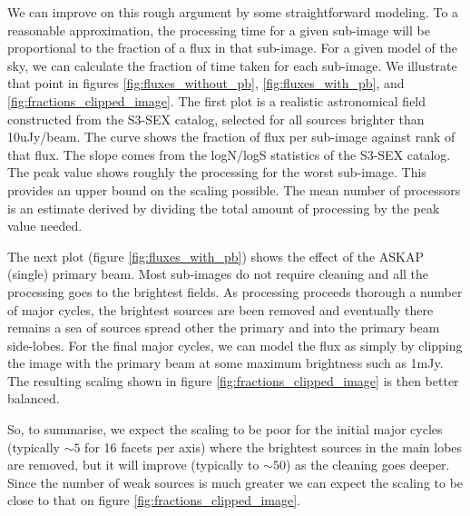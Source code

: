 \documentclass[11pt,a4paper,variablewidth]{article}
\begin{document}
We can improve on this rough argument by some straightforward modeling. To a reasonable approximation, the processing time for a given sub-image will be proportional to the fraction of a flux in that sub-image. For a given model of the sky, we can calculate the fraction of time taken for each sub-image. We illustrate that point in figures \ref{fig:fluxes_without_pb}, \ref{fig:fluxes_with_pb}, and \ref{fig:fractions_clipped_image}. The first plot is a realistic astronomical field constructed from the S3-SEX catalog, selected for all sources brighter than 10uJy/beam. The curve shows the fraction of flux per sub-image against rank of that flux. The slope comes from the logN/logS statistics of the S3-SEX catalog. The peak value shows roughly the processing for the worst sub-image. This provides an upper bound on the scaling possible. The mean number of processors is an estimate derived by dividing the total amount of processing by the peak value needed.

The next plot (figure \ref{fig:fluxes_with_pb}) shows the effect of the ASKAP (single) primary beam. Most sub-images do not require cleaning and all the processing goes to the brightest fields. As processing proceeds thorough a number of major cycles, the brightest sources are been removed and eventually there remains a sea of sources spread other the primary and into the primary beam side-lobes. For the final major cycles, we can model the flux as simply by clipping the image with the primary beam at some maximum brightness such as 1mJy. The resulting scaling shown in figure \ref{fig:fractions_clipped_image} is then better balanced.

So, to summarise, we expect the scaling to be poor for the initial major cycles (typically $\sim 5$ for 16 facets per axis) where the brightest sources in the main lobes are removed, but it will improve (typically to $\sim 50$) as the cleaning goes deeper. Since the number of weak sources is much greater we can expect the scaling to be close to that on figure \ref{fig:fractions_clipped_image}.
\end{document}
